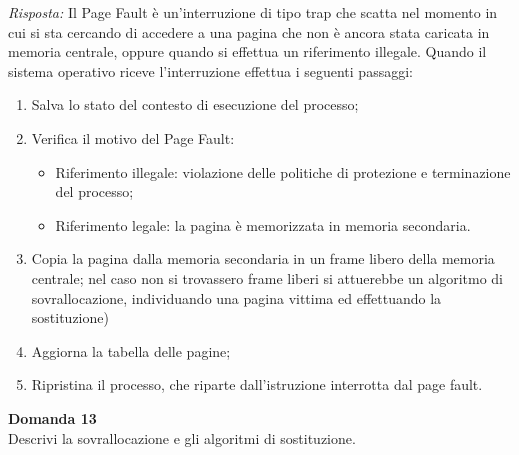 \documentclass{article}
\newenvironment{problem}[2][Domanda]
    { \begin{mdframed}[backgroundcolor=gray!20] \textbf{#1 #2} \\}
    {  \end{mdframed}}
\newenvironment{solution}
    {\textit{Risposta:}}
    {}
\begin{document}
\begin{solution}
Il Page Fault è un’interruzione di tipo trap che scatta nel momento in cui si sta cercando di accedere a una pagina che non è ancora stata caricata in memoria centrale, oppure quando si effettua un riferimento illegale.
\newline
Quando il sistema operativo riceve l’interruzione effettua i seguenti passaggi:
\begin{enumerate}
    \item Salva lo stato del contesto di esecuzione del processo;
    \item Verifica il motivo del Page Fault:
    \begin{itemize}
        \item Riferimento illegale: violazione delle politiche di protezione e terminazione del processo;
        \item Riferimento legale: la pagina è memorizzata in memoria secondaria.
    \end{itemize}
    \item Copia la pagina dalla memoria secondaria in un frame libero della memoria centrale; nel caso non si trovassero frame liberi si attuerebbe un algoritmo di sovrallocazione, individuando una pagina vittima ed effettuando la sostituzione)
    \item Aggiorna la tabella delle pagine;
    \item Ripristina il processo, che riparte dall’istruzione interrotta dal page fault.
\end{enumerate}
\end{solution}
\begin{problem}{13}
Descrivi la sovrallocazione e gli algoritmi di sostituzione.
\end{problem}
\end{document}
